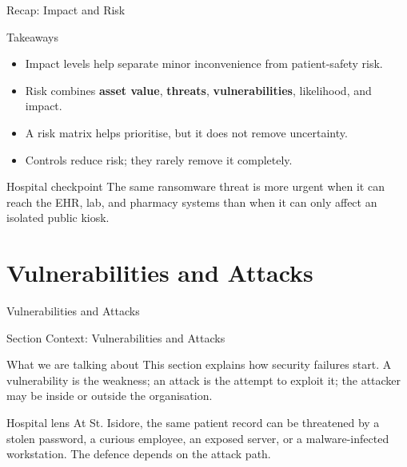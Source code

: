\documentclass[presentation]{beamer}
\newcommand{\sectiontitleframe}[1]{
\begin{frame}[plain,c]
\begin{center}
{\usebeamerfont{title}\usebeamercolor[fg]{title}#1}
\end{center}
\end{frame}
}
\begin{document}
\begin{frame}[c]{Recap: Impact and Risk}
\begin{block}{Takeaways}
\begin{itemize}
    \item Impact levels help separate minor inconvenience from patient-safety risk.
    \item Risk combines \textbf{asset value}, \textbf{threats}, \textbf{vulnerabilities}, likelihood, and impact.
    \item A risk matrix helps prioritise, but it does not remove uncertainty.
    \item Controls reduce risk; they rarely remove it completely.
\end{itemize}
\end{block}

\begin{exampleblock}{Hospital checkpoint}
The same ransomware threat is more urgent when it can reach the EHR, lab, and pharmacy systems
than when it can only affect an isolated public kiosk.
\end{exampleblock}
\end{frame}

\section{Vulnerabilities and Attacks}
\sectiontitleframe{Vulnerabilities and Attacks}

\begin{frame}[c]{Section Context: Vulnerabilities and Attacks}
\begin{block}{What we are talking about}
This section explains how security failures start. A vulnerability is the weakness; an attack is
the attempt to exploit it; the attacker may be inside or outside the organisation.
\end{block}

\begin{exampleblock}{Hospital lens}
At St. Isidore, the same patient record can be threatened by a stolen password, a curious employee,
an exposed server, or a malware-infected workstation. The defence depends on the attack path.
\end{exampleblock}
\end{frame}
\end{document}
